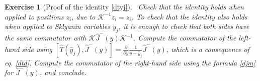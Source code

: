 \documentclass[12pt, a4paper, notitlepage, twoside]{report}
\numberwithin{equation}{section}
\theoremstyle{break}
\newtheorem{exo}{Exercise}[chapter]
\begin{document}
\begin{exo}[Proof of the identity \eqref{dtyj}]
 ~\label{exoktk}
Check that the identity holds when applied to positions $z_i$, due to $\mathcal{K}^{-1}z_i = z_i$. 
To check that the identity also holds when applied to Sklyanin variables $y_j$, it is enough to check 
that both sides have the same commutator with $\mathcal{K}\hat{J}^-(y)\mathcal{K}^{-1}$. 
Compute the commutator of the left-hand side using $[\hat{T}(\hat{y}_j),\hat{J}^-(y)]={\frac{\partial}{\partial y}}\frac{1}{y-\hat{y}_j}\hat{J}^-(y)$, which is a consequence of eq. \eqref{dtd}.
Compute the commutator of the 
right-hand side using the formula \eqref{djm} for $\hat{J}^-(y)$, and conclude.
\end{exo}

\printindex




%
\end{document}
